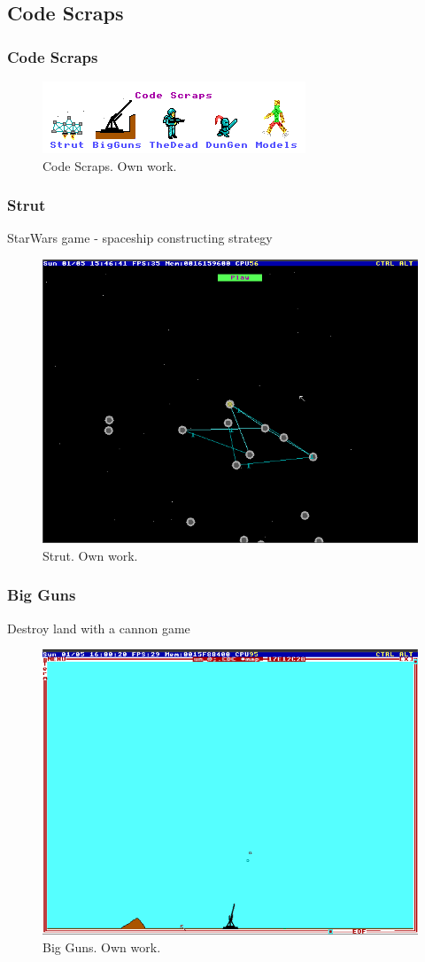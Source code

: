\documentclass{beamer}
\begin{document}
	\subsection{Code Scraps}
	\begin{frame}
		\frametitle{Code Scraps}
		\begin{figure}
			\centering
			\includegraphics[width=0.5\linewidth]{images/code_scraps.png}
			\caption{Code Scraps. Own work.}
			\label{fig:code_scraps}
		\end{figure}
	\end{frame}

	\begin{frame}
		\frametitle{Strut}
		StarWars game - spaceship constructing strategy
		\begin{figure}
			\centering
			\includegraphics[width=0.6\linewidth]{images/strut.png}
			\caption{Strut. Own work.}
			\label{fig:strut}
		\end{figure}
	\end{frame}

	\begin{frame}
		\frametitle{Big Guns}
		Destroy land with a cannon game
		\begin{figure}
			\centering
			\includegraphics[width=0.6\linewidth]{images/big_guns.png}
			\caption{Big Guns. Own work.}
			\label{fig:big_guns}
		\end{figure}
	\end{frame}
\end{document}
